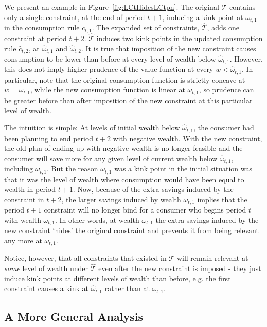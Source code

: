 \documentclass[titlepage]{\econtex}
\providecommand{\wAlt}{\omega}
\begin{document}
We present an example in Figure~\ref{fig:LCtHidesLCtpn}. The original $\mathcal{T}$ contains only a single constraint, at the end of period $t+1$, inducing a kink point at $\wAlt_{t,1}$ in the consumption rule $c_{t,1}$. The expanded set of constraints, $\hat{\mathcal{T}}$, adds one constraint at period $t+2$. $\hat{\mathcal{T}}$ induces two kink points in the updated consumption rule $\hat{c}_{t,2}$, at $\hat{\wAlt}_{t,1}$ and $\hat{\wAlt}_{t,2}$.  It is true that imposition of the new constraint causes consumption to be lower than before at every level of wealth below $\hat{\wAlt}_{t,1}$.  However, this does not imply higher prudence of the value function at every $w <\hat{\wAlt}_{t,1}$.  In particular, note that the original consumption function is strictly concave at $w = \wAlt_{t,1}$, while the new consumption function is linear at $\wAlt_{t,1}$, so prudence can be greater before than after imposition of the new constraint at this particular level of wealth.

The intuition is simple: At levels of initial wealth below $\hat{\wAlt}_{t,1}$, the consumer had been planning to end period $t+2$ with negative wealth. With the new constraint, the old plan of ending up with negative wealth is no longer feasible and the consumer will save more for any given level of current wealth below $\hat{\wAlt}_{t,1}$, including $\wAlt_{t,1}$. But the reason $\wAlt_{t,1}$ was a kink point in the initial situation was that it was the level of wealth where consumption would have been equal to wealth in period $t+1$. Now, because of the extra savings induced by the constraint in $t+2$, the larger savings induced by wealth $\wAlt_{t,1}$ implies that the period $t+1$ constraint will no longer bind for a consumer who begins period $t$ with wealth $\wAlt_{t,1}$. In other words, at wealth $\wAlt_{t,1}$ the extra savings induced by the new constraint `hides' the original constraint and prevents it from being relevant any more at $\wAlt_{t,1}$.

Notice, however, that all constraints that existed in $\mathcal{T}$ will remain relevant at \textit{some} level of wealth under $\hat{\mathcal{T}}$ even after the new constraint is imposed - they just induce kink points at different levels of wealth than before, e.g. the first constraint causes a kink at $\hat{\wAlt}_{t,1}$ rather than at $\wAlt_{t,1}$.

\subsection{A More General Analysis}
\label{subsubsec:MoreGenConstr}
\end{document}
